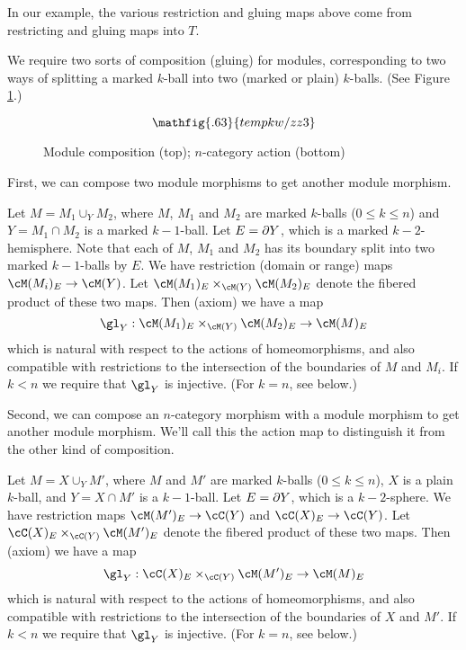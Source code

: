 In our example, the various restriction and gluing maps above come from
restricting and gluing maps into $T$.

We require two sorts of composition (gluing) for modules, corresponding to two ways
of splitting a marked $k$-ball into two (marked or plain) $k$-balls.
(See Figure \ref{zzz3}.)

\begin{figure}[!ht]
\begin{equation*}
\mathfig{.63}{tempkw/zz3}
\end{equation*}
\caption{Module composition (top); $n$-category action (bottom)}
\label{zzz3}
\end{figure}

First, we can compose two module morphisms to get another module morphism.

{Let $M = M_1 \cup_Y M_2$, where $M$, $M_1$ and $M_2$ are marked $k$-balls ($0\le k\le n$)
and $Y = M_1\cap M_2$ is a marked $k{-}1$-ball.
Let $E = \partial Y$, which is a marked $k{-}2$-hemisphere.
Note that each of $M$, $M_1$ and $M_2$ has its boundary split into two marked $k{-}1$-balls by $E$.
We have restriction (domain or range) maps $\cM(M_i)_E \to \cM(Y)$.
Let $\cM(M_1)_E \times_{\cM(Y)} \cM(M_2)_E$ denote the fibered product of these two maps. 
Then (axiom) we have a map
\[
	\gl_Y : \cM(M_1)_E \times_{\cM(Y)} \cM(M_2)_E \to \cM(M)_E
\]
which is natural with respect to the actions of homeomorphisms, and also compatible with restrictions
to the intersection of the boundaries of $M$ and $M_i$.
If $k < n$ we require that $\gl_Y$ is injective.
(For $k=n$, see below.)}



Second, we can compose an $n$-category morphism with a module morphism to get another
module morphism.
We'll call this the action map to distinguish it from the other kind of composition.

{Let $M = X \cup_Y M'$, where $M$ and $M'$ are marked $k$-balls ($0\le k\le n$),
$X$ is a plain $k$-ball,
and $Y = X\cap M'$ is a $k{-}1$-ball.
Let $E = \partial Y$, which is a $k{-}2$-sphere.
We have restriction maps $\cM(M')_E \to \cC(Y)$ and $\cC(X)_E\to \cC(Y)$.
Let $\cC(X)_E \times_{\cC(Y)} \cM(M')_E$ denote the fibered product of these two maps. 
Then (axiom) we have a map
\[
	\gl_Y :\cC(X)_E \times_{\cC(Y)} \cM(M')_E \to \cM(M)_E
\]
which is natural with respect to the actions of homeomorphisms, and also compatible with restrictions
to the intersection of the boundaries of $X$ and $M'$.
If $k < n$ we require that $\gl_Y$ is injective.
(For $k=n$, see below.)}


